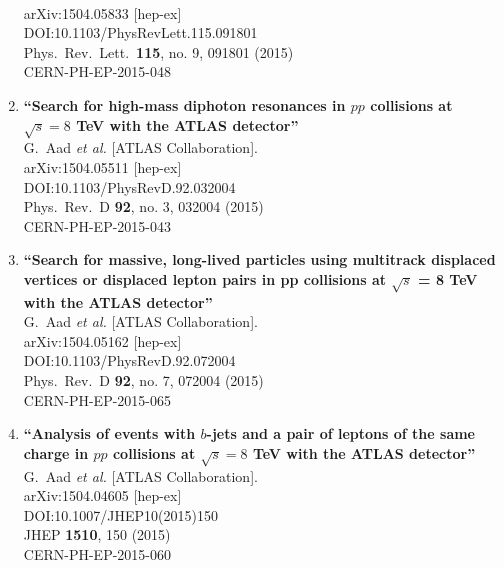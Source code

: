 \documentclass{article}
\begin{document}
\begin{enumerate}
  \\{}arXiv:1504.05833 [hep-ex]
  \\{}DOI:10.1103/PhysRevLett.115.091801
  \\{}Phys.\ Rev.\ Lett.\  {\bf 115}, no. 9, 091801 (2015)
  \\{}CERN-PH-EP-2015-048
\item%
{\bf ``Search for high-mass diphoton resonances in $pp$ collisions at $\sqrt{s}=8$ TeV with the ATLAS detector''}
  \\{}G.~Aad {\it et al.} [ATLAS Collaboration].
  \\{}arXiv:1504.05511 [hep-ex]
  \\{}DOI:10.1103/PhysRevD.92.032004
  \\{}Phys.\ Rev.\ D {\bf 92}, no. 3, 032004 (2015)
  \\{}CERN-PH-EP-2015-043
\item%
{\bf ``Search for massive, long-lived particles using multitrack displaced vertices or displaced lepton pairs in pp collisions at $\sqrt{s}$ = 8 TeV with the ATLAS detector''}
  \\{}G.~Aad {\it et al.} [ATLAS Collaboration].
  \\{}arXiv:1504.05162 [hep-ex]
  \\{}DOI:10.1103/PhysRevD.92.072004
  \\{}Phys.\ Rev.\ D {\bf 92}, no. 7, 072004 (2015)
  \\{}CERN-PH-EP-2015-065
\item%
{\bf ``Analysis of events with $b$-jets and a pair of leptons of the same charge in $pp$ collisions at $\sqrt{s}=8$ TeV with the ATLAS detector''}
  \\{}G.~Aad {\it et al.} [ATLAS Collaboration].
  \\{}arXiv:1504.04605 [hep-ex]
  \\{}DOI:10.1007/JHEP10(2015)150
  \\{}JHEP {\bf 1510}, 150 (2015)
  \\{}CERN-PH-EP-2015-060

\end{enumerate}
\end{document}
